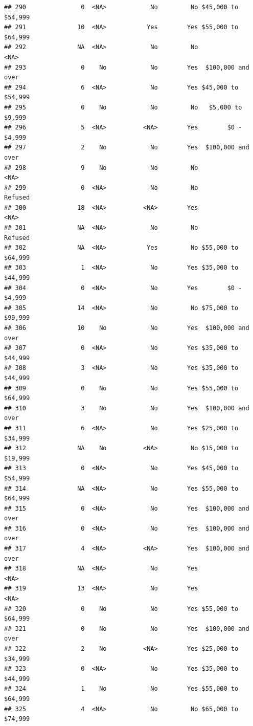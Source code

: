 \documentclass[man]{apa6}
\begin{document}
\begin{verbatim}
## 290               0  <NA>            No         No $45,000 to $54,999
## 291              10  <NA>           Yes        Yes $55,000 to $64,999
## 292              NA  <NA>            No         No               <NA>
## 293               0    No            No        Yes  $100,000 and over
## 294               6  <NA>            No        Yes $45,000 to $54,999
## 295               0    No            No         No   $5,000 to $9,999
## 296               5  <NA>          <NA>        Yes        $0 - $4,999
## 297               2    No            No        Yes  $100,000 and over
## 298               9    No            No         No               <NA>
## 299               0  <NA>            No         No            Refused
## 300              18  <NA>          <NA>        Yes               <NA>
## 301              NA  <NA>            No         No            Refused
## 302              NA  <NA>           Yes         No $55,000 to $64,999
## 303               1  <NA>            No        Yes $35,000 to $44,999
## 304               0  <NA>            No        Yes        $0 - $4,999
## 305              14  <NA>            No         No $75,000 to $99,999
## 306              10    No            No        Yes  $100,000 and over
## 307               0  <NA>            No        Yes $35,000 to $44,999
## 308               3  <NA>            No        Yes $35,000 to $44,999
## 309               0    No            No        Yes $55,000 to $64,999
## 310               3    No            No        Yes  $100,000 and over
## 311               6  <NA>            No        Yes $25,000 to $34,999
## 312              NA    No          <NA>         No $15,000 to $19,999
## 313               0  <NA>            No        Yes $45,000 to $54,999
## 314              NA  <NA>            No        Yes $55,000 to $64,999
## 315               0  <NA>            No        Yes  $100,000 and over
## 316               0  <NA>            No        Yes  $100,000 and over
## 317               4  <NA>          <NA>        Yes  $100,000 and over
## 318              NA  <NA>            No        Yes               <NA>
## 319              13  <NA>            No        Yes               <NA>
## 320               0    No            No        Yes $55,000 to $64,999
## 321               0    No            No        Yes  $100,000 and over
## 322               2    No          <NA>        Yes $25,000 to $34,999
## 323               0  <NA>            No        Yes $35,000 to $44,999
## 324               1    No            No        Yes $55,000 to $64,999
## 325               4  <NA>            No         No $65,000 to $74,999

\end{verbatim}
\end{document}
